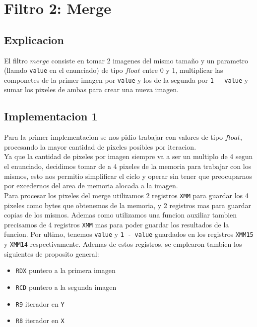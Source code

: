 \section{Filtro 2: Merge}

\subsection{Explicacion}
El filtro $merge$ consiste en tomar 2 imagenes del mismo tamaño y un parametro (llamdo \texttt{value} en el enunciado) de tipo $float$ entre 0 y 1, multiplicar las componetes de la primer imagen por \texttt{value} y los de la segunda por \texttt{1 - value} y sumar los pixeles de ambas para crear una nueva imagen. \\

\subsection{Implementacion 1}
Para la primer implementacion se nos pidio trabajar con valores de tipo $float$, procesando la mayor cantidad de pixeles posibles por iteracion. \\

Ya que la cantidad de pixeles por imagen siempre va a ser un multiplo de 4 segun el enunciado, decidimos tomar de a 4 pixeles de la memoria para trabajar con los mismos, esto nos permitio simplificar el ciclo y operar sin tener que preocuparnos por excedernos del area de memoria alocada a la imagen.\\

Para procesar los pixeles del merge utilizamos 2 registros \texttt{XMM} para guardar los 4 pixeles como bytes que obtenemos de la memoria, y 2 registros mas para guardar copias de los mismos. Ademas como utilizamos una funcion auxiliar tambien precisamos de 4 registros \texttt{XMM} mas para poder guardar los resultados de la funcion. Por ultimo, tenemos \texttt{value} y \texttt{1 - value} guardados en los registros \texttt{XMM15} y \texttt{XMM14} respectivamente. Ademas de estos registros, se emplearon tambien los siguientes de proposito general:\\

\noindent
\begin{itemize}
	\item \texttt{RDX} puntero a la primera imagen
	\item \texttt{RCD} puntero a la segunda imagen
	\item \texttt{R9} iterador en \texttt{Y}
	\item \texttt{R8} iterador en \texttt{X}
\end{itemize}

